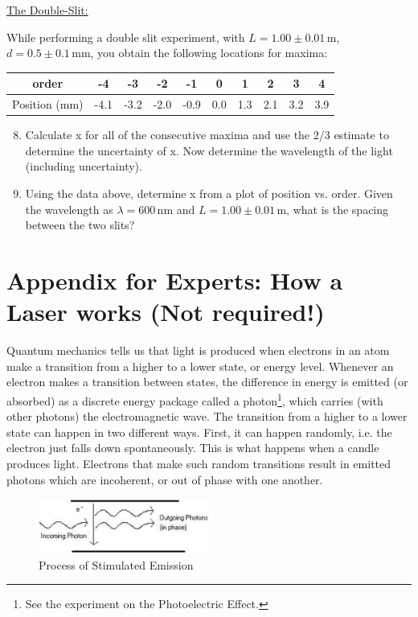 \underline{The Double-Slit:}

While performing a double slit experiment, with $L = 1.00\pm 0.01\,\mathrm{m}$, $d = 0.5\pm 0.1\, \mathrm{mm}$, you obtain the following locations for maxima:
\begin{table}[h]
 \centering
 \begin{tabular}{|c|c|c|c|c|c|c|c|c|c|}
  \hline
  order&-4&-3&-2&-1&0&1&2&3&4\\
  \hline
  Position (mm)&-4.1&-3.2&-2.0&-0.9&0.0&1.3&2.1&3.2&3.9\\
  \hline
 \end{tabular}
\end{table}
\begin{enumerate}\setcounter{enumi}{7}
\item Calculate x for all of the consecutive maxima and use the 2/3 estimate to determine the uncertainty of x. Now determine the wavelength of the light (including uncertainty).
\item Using the data above, determine x from a plot of position vs. order. Given the wavelength as $\lambda = 600\,\mathrm{nm}$ and $L = 1.00\pm 0.01\,\mathrm{m}$, what is the spacing between the two slits?
\end{enumerate}

\section{Appendix for Experts: How a Laser works (Not required!)}
Quantum mechanics tells us that light is produced when electrons in an atom make a transition from a higher to a lower state, or energy level. Whenever an electron makes a
transition between states, the difference in energy is emitted (or absorbed) as a discrete energy package called a photon\footnote{See the experiment on the Photoelectric Effect.}, which carries (with other photons) the electromagnetic wave. The transition from a higher to a lower state can happen in two different ways. First, it can happen randomly, i.e. the electron just falls down spontaneously. This is what happens when a candle produces light. Electrons that make such random transitions result in emitted photons which are incoherent, or out of phase with one another. \myskip
\begin{figure}[h]
\centering
\includegraphics[width=0.5\textwidth]{./Exp8/pic/image9.png}
\caption{Process of Stimulated Emission}
\label{fig:stimulatedemission}
\end{figure}

